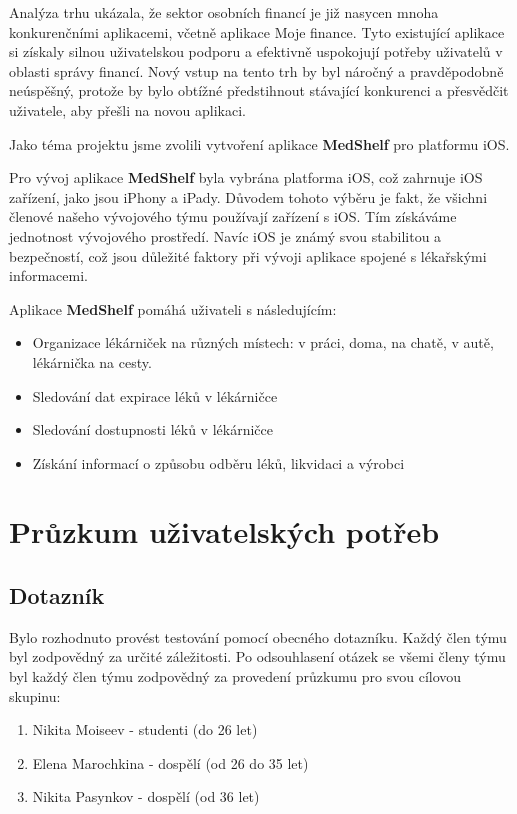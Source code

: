 \documentclass[a4paper, 11pt]{article}
\begin{document}
Analýza trhu ukázala, že sektor osobních financí je již nasycen mnoha konkurenčními aplikacemi, včetně aplikace Moje finance. Tyto existující aplikace si získaly silnou uživatelskou podporu a efektivně uspokojují potřeby uživatelů v oblasti správy financí. Nový vstup na tento trh by byl náročný a pravděpodobně neúspěšný, protože by bylo obtížné předstihnout stávající konkurenci a přesvědčit uživatele, aby přešli na novou aplikaci.

Jako téma projektu jsme zvolili vytvoření aplikace \textbf{MedShelf} pro platformu iOS.

Pro vývoj aplikace \textbf{MedShelf} byla vybrána platforma iOS, což zahrnuje iOS zařízení, jako jsou iPhony a iPady. Důvodem tohoto výběru je fakt, že všichni členové našeho vývojového týmu používají zařízení s iOS. Tím získáváme jednotnost vývojového prostředí.
Navíc iOS je známý svou stabilitou a bezpečností, což jsou důležité faktory při vývoji aplikace spojené s lékařskými informacemi.

Aplikace \textbf{MedShelf} pomáhá uživateli s následujícím:
\begin{itemize}
  \item Organizace lékárniček na různých místech: v práci, doma, na chatě, v autě, lékárnička na cesty.
  \item Sledování dat expirace léků v lékárničce
  \item Sledování dostupnosti léků v lékárničce
  \item Získání informací o způsobu odběru léků, likvidaci a výrobci
\end{itemize}

	\section{Průzkum uživatelských potřeb}

	\subsection{Dotazník}
 Bylo rozhodnuto provést testování pomocí obecného dotazníku. Každý člen týmu byl zodpovědný za určité záležitosti. Po odsouhlasení otázek se všemi členy týmu byl každý člen týmu zodpovědný za provedení průzkumu pro svou cílovou skupinu:
 \begin{enumerate}
     \item Nikita Moiseev - studenti (do 26 let)
     \item Elena Marochkina - dospělí (od 26 do 35 let)
     \item Nikita Pasynkov - dospělí (od 36 let)
 \end{enumerate}
\end{document}
